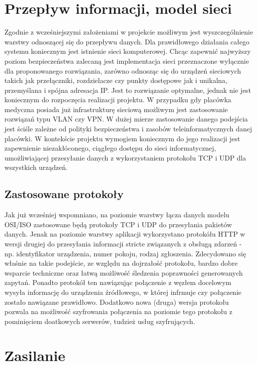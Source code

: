 \documentclass[12pt]{article} %
\begin{document}
\section{Przepływ informacji, model sieci}

Zgodnie z wcześniejszymi założeniami w projekcie możliwym jest wyszczególnienie warstwy odnoszącej się do przepływu danych. Dla prawidłowego działania całego systemu koniecznym jest istnienie sieci komputerowej. Chcąc zapewnić najwyższy poziom bezpieczeństwa zalecaną jest implementacja sieci przeznaczone wyłącznie dla proponowanego rozwiązania, zarówno odnosząc się do urządzeń sieciowych takich jak przełączniki, rozdzielacze czy punkty dostępowe jak i unikalna, przemyślana  i spójna adresacja IP. Jest to rozwiązanie optymalne, jednak nie jest koniecznym do rozpoczęcia realizacji projektu. W przypadku gdy placówka medyczna posiada już infrastrukturę sieciową możliwym jest zastosowanie rozwiązań typu VLAN czy VPN. W dużej mierze zastosowanie danego podejścia jest ściśle zależne od polityki bezpieczeństwa i zasobów teleinformatycznych danej placówki. W kontekście projektu wymogiem koniecznym do jego realizacji jest zapewnienie niezakłóconego, ciągłego dostępu do sieci informatycznej,  umożliwiającej przesyłanie danych z wykorzystaniem protokołu TCP i UDP dla wszystkich urządzeń.

\subsection{Zastosowane protokoły}

Jak już wcześniej wspomniano, na poziomie warstwy łącza danych modelu OSI/ISO zastosowane będą protokoły TCP i UDP do przesyłania pakietów danych. Jenak na poziomie warstwy aplikacji wykorzystano protokółu HTTP w wersji drugiej do przesyłania informacji stricte związanych z obsługą zdarzeń - np.  identyfikator urządzenia, numer pokoju, rodzaj zgłoszenia. Zdecydowano się właśnie na takie podejście, ze względu na dojrzałość protokołu, bardzo dobre wsparcie techniczne oraz łatwą możliwość śledzenia poprawności generowanych zapytań. Ponadto protokół ten nawiązując połączenie z węzłem docelowym wysyła informację do urządzenia źródłowego, w której infrmuje czy połączenie zostało nawiązane prawidłowo. Dodatkowo nowa (druga) wersja protokołu pozwala na możliwość szyfrowania połączenia na poziomie tego protokołu z pominięciem doatkowych serwerów, tudzież usług szyfrujących.

\section{Zasilanie}
\end{document}
